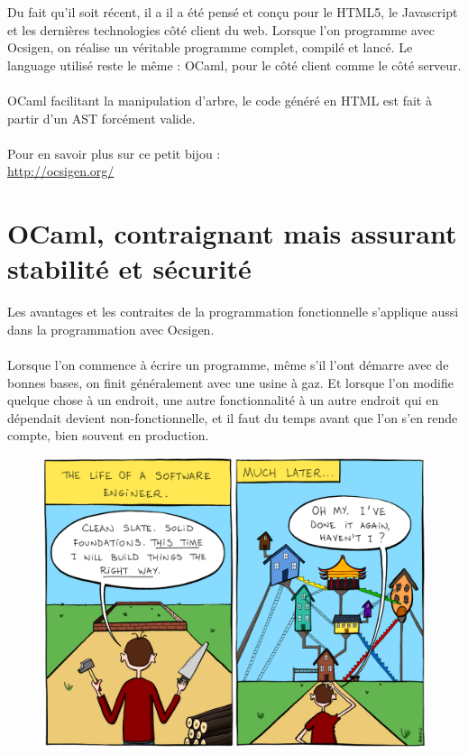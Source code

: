\documentclass{life-fr}
\begin{document}
\newpage

Du fait qu'il soit récent, il a  il a été pensé et conçu pour le HTML5, le Javascript et les dernières technologies côté client du web. Lorsque l'on programme avec Ocsigen, on réalise un véritable programme complet, compilé et lancé. Le language utilisé reste le même : OCaml, pour le côté client comme le côté serveur.\\
\\
OCaml facilitant la manipulation d'arbre, le code généré en HTML est fait à partir d'un AST forcément valide.\\
\\
Pour en savoir plus sur ce petit bijou :\\
\url{http://ocsigen.org/}

\section{OCaml, contraignant mais assurant stabilité et sécurité}

Les avantages et les contraites de la programmation fonctionnelle s'applique aussi dans la programmation avec Ocsigen.\\
\\
Lorsque l'on commence à écrire un programme, même s'il l'ont démarre avec de bonnes bases, on finit généralement avec une usine à gaz. Et lorsque l'on modifie quelque chose à un endroit, une autre fonctionnalité à un autre endroit qui en dépendait devient non-fonctionnelle, et il faut du temps avant que l'on s'en rende compte, bien souvent en production.\\

\begin{figure}[H]
  \begin{center}
    \includegraphics[width=13cm]{img/proj.png}
  \end{center}
\end{figure}
\end{document}
